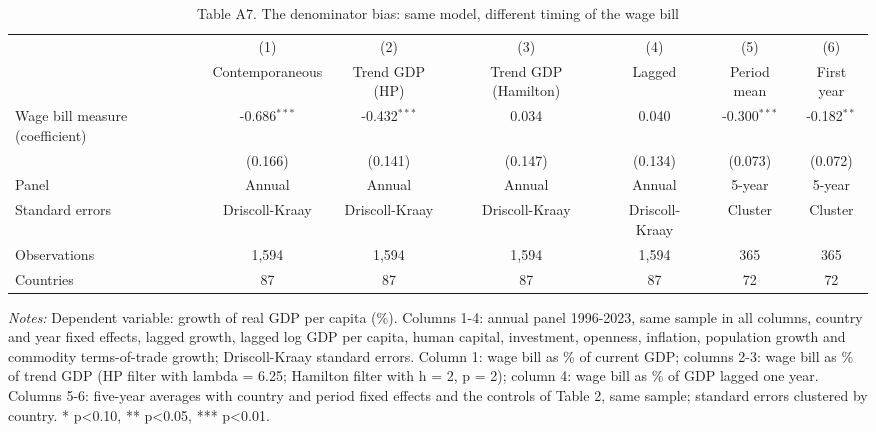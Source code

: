 \begin{table}[htbp]\centering\footnotesize
\providecommand{\sym}[1]{\ensuremath{^{#1}}}
\caption{Table A7. The denominator bias: same model, different timing of the wage bill}\label{tab:TableA7_denominator}
\begin{tabular}{l*{6}{c}}
\toprule
 & (1) & (2) & (3) & (4) & (5) & (6) \\
 & Contemporaneous & Trend GDP (HP) & Trend GDP (Hamilton) & Lagged & Period mean & First year \\
\midrule
Wage bill measure (coefficient) & -0.686\sym{***} & -0.432\sym{***} & 0.034 & 0.040 & -0.300\sym{***} & -0.182\sym{**} \\
 & (0.166) & (0.141) & (0.147) & (0.134) & (0.073) & (0.072) \\
\midrule
Panel & Annual & Annual & Annual & Annual & 5-year & 5-year \\
Standard errors & Driscoll-Kraay & Driscoll-Kraay & Driscoll-Kraay & Driscoll-Kraay & Cluster & Cluster \\
Observations & 1,594 & 1,594 & 1,594 & 1,594 & 365 & 365 \\
Countries & 87 & 87 & 87 & 87 & 72 & 72 \\
\bottomrule
\end{tabular}
\begin{minipage}{0.95\linewidth}\vspace{4pt}\scriptsize \textit{Notes:} Dependent variable: growth of real GDP per capita (\%). Columns 1-4: annual panel 1996-2023, same sample in all columns, country and year fixed effects, lagged growth, lagged log GDP per capita, human capital, investment, openness, inflation, population growth and commodity terms-of-trade growth; Driscoll-Kraay standard errors. Column 1: wage bill as \% of current GDP; columns 2-3: wage bill as \% of trend GDP (HP filter with lambda = 6.25; Hamilton filter with h = 2, p = 2); column 4: wage bill as \% of GDP lagged one year. Columns 5-6: five-year averages with country and period fixed effects and the controls of Table 2, same sample; standard errors clustered by country. * p<0.10, ** p<0.05, *** p<0.01.\end{minipage}
\end{table}
